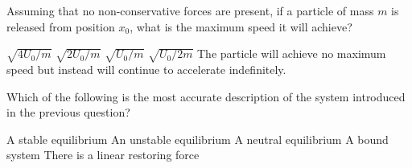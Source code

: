 \documentclass{../../oss-apphys-exam}
\begin{document}
\begin{multicols*}{2}
\begin{questions}
    \question Assuming that no non-conservative forces are present, if a
    particle of mass $m$ is released from position $x_0$, what is the maximum
    speed it will achieve?
    \label{q:well1}
    \begin{choices}
      \choice $\sqrt{4U_0/m}$
      \choice $\sqrt{2U_0/m}$
      \choice $\sqrt{U_0/m}$
      \choice $\sqrt{U_0/2m}$
      \choice The particle will achieve no maximum speed but instead will
      continue to accelerate indefinitely.
    \end{choices}
    \vspace{.7in}
    
    \question Which of the following is the most accurate description of the
    system introduced in the previous question?
    \label{q:well2}
    \begin{choices}
      \choice A stable equilibrium
      \choice An unstable equilibrium
      \choice A neutral equilibrium
      \choice A bound system
      \choice There is a linear restoring force
    \end{choices}
    \vspace{.7in}
    


\end{questions}
\end{multicols*}
\end{document}
